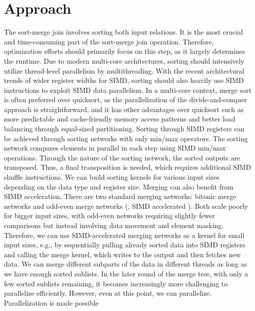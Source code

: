 \section{Approach}
\label{sec:approach}


The sort-merge join involves sorting both input relations. It is the most crucial and 
time-consuming part of the sort-merge join operation. Therefore, optimization efforts should
primarily focus on this step, as it largely determines the runtime. Due to modern multi-core 
architectures, sorting should intensively utilize thread-level parallelism by multithreading.
With the recent architectural trends of wider register widths for SIMD, sorting should also
heavily use SIMD instructions to exploit SIMD data parallelism. In a multi-core context, merge
sort is often preferred over quicksort, as the parallelization of the divide-and-conquer approach
is straightforward, and it has other advantages over quicksort such as more predictable and 
cache-friendly memory access patterns and better load balancing through equal-sized partitioning. 
Sorting through SIMD registers can be achieved through sorting networks \cite{10.1145/1468075.1468121} 
with only min/max operators.
The sorting network compares elements in parallel in each step using SIMD min/max operations. 
Through the nature of the sorting network, the sorted outputs are transposed. Thus, a final
transposition is needed, which requires additional SIMD shuffle instructions. We can build
sorting kernels for various input sizes depending on the data type and register size. Merging can
also benefit from SIMD acceleration. There are two standard merging networks: bitonic merge networks
and odd-even merge networks (\cite{10.1145/1468075.1468121}, SIMD accelerated \cite{4336211}). Both scale poorly for bigger input sizes, with odd-even networks 
requiring slightly fewer comparisons but instead involving data movement and element masking.
Therefore, we can use SIMD-accelerated merging networks as a kernel for small input sizes, e.g., by
sequentially pulling already sorted data into SIMD registers and calling the merge kernel, which 
writes to the output and then fetches new data. We can merge different subparts of the data in
different threads as long as we have enough sorted sublists. In the later round of the merge tree,
with only a few sorted sublists remaining, it becomes increasingly more challenging to parallelize
efficiently. However, even at this point, we can parallelize. Parallelization is made possible 

